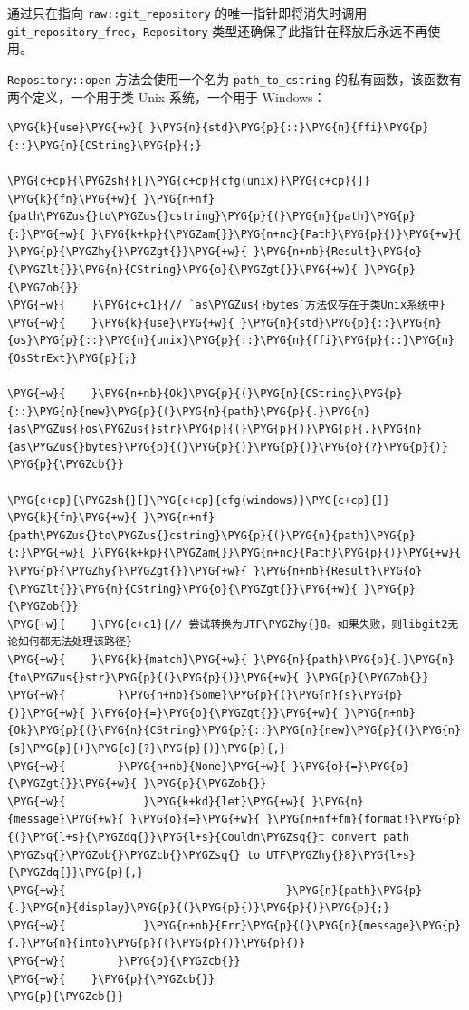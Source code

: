 通过只在指向 \texttt{raw::git\_repository} 的唯一指针即将消失时调用 \texttt{git\_repository\_free}，\texttt{Repository} 类型还确保了此指针在释放后永远不再使用。

\texttt{Repository::open} 方法会使用一个名为 \texttt{path\_to\_cstring} 的私有函数，该函数有两个定义，一个用于类 Unix 系统，一个用于 Windows：

\begin{Verbatim}[commandchars=\\\{\},breaklines=true,breakanywhere=true,fontsize=\codefont,xleftmargin=17bp]
\PYG{k}{use}\PYG{+w}{ }\PYG{n}{std}\PYG{p}{::}\PYG{n}{ffi}\PYG{p}{::}\PYG{n}{CString}\PYG{p}{;}

\PYG{c+cp}{\PYGZsh{}[}\PYG{c+cp}{cfg(unix)}\PYG{c+cp}{]}
\PYG{k}{fn}\PYG{+w}{ }\PYG{n+nf}{path\PYGZus{}to\PYGZus{}cstring}\PYG{p}{(}\PYG{n}{path}\PYG{p}{:}\PYG{+w}{ }\PYG{k+kp}{\PYGZam{}}\PYG{n+nc}{Path}\PYG{p}{)}\PYG{+w}{ }\PYG{p}{\PYGZhy{}\PYGZgt{}}\PYG{+w}{ }\PYG{n+nb}{Result}\PYG{o}{\PYGZlt{}}\PYG{n}{CString}\PYG{o}{\PYGZgt{}}\PYG{+w}{ }\PYG{p}{\PYGZob{}}
\PYG{+w}{    }\PYG{c+c1}{// `as\PYGZus{}bytes`方法仅存在于类Unix系统中}
\PYG{+w}{    }\PYG{k}{use}\PYG{+w}{ }\PYG{n}{std}\PYG{p}{::}\PYG{n}{os}\PYG{p}{::}\PYG{n}{unix}\PYG{p}{::}\PYG{n}{ffi}\PYG{p}{::}\PYG{n}{OsStrExt}\PYG{p}{;}

\PYG{+w}{    }\PYG{n+nb}{Ok}\PYG{p}{(}\PYG{n}{CString}\PYG{p}{::}\PYG{n}{new}\PYG{p}{(}\PYG{n}{path}\PYG{p}{.}\PYG{n}{as\PYGZus{}os\PYGZus{}str}\PYG{p}{(}\PYG{p}{)}\PYG{p}{.}\PYG{n}{as\PYGZus{}bytes}\PYG{p}{(}\PYG{p}{)}\PYG{p}{)}\PYG{o}{?}\PYG{p}{)}
\PYG{p}{\PYGZcb{}}

\PYG{c+cp}{\PYGZsh{}[}\PYG{c+cp}{cfg(windows)}\PYG{c+cp}{]}
\PYG{k}{fn}\PYG{+w}{ }\PYG{n+nf}{path\PYGZus{}to\PYGZus{}cstring}\PYG{p}{(}\PYG{n}{path}\PYG{p}{:}\PYG{+w}{ }\PYG{k+kp}{\PYGZam{}}\PYG{n+nc}{Path}\PYG{p}{)}\PYG{+w}{ }\PYG{p}{\PYGZhy{}\PYGZgt{}}\PYG{+w}{ }\PYG{n+nb}{Result}\PYG{o}{\PYGZlt{}}\PYG{n}{CString}\PYG{o}{\PYGZgt{}}\PYG{+w}{ }\PYG{p}{\PYGZob{}}
\PYG{+w}{    }\PYG{c+c1}{// 尝试转换为UTF\PYGZhy{}8。如果失败，则libgit2无论如何都无法处理该路径}
\PYG{+w}{    }\PYG{k}{match}\PYG{+w}{ }\PYG{n}{path}\PYG{p}{.}\PYG{n}{to\PYGZus{}str}\PYG{p}{(}\PYG{p}{)}\PYG{+w}{ }\PYG{p}{\PYGZob{}}
\PYG{+w}{        }\PYG{n+nb}{Some}\PYG{p}{(}\PYG{n}{s}\PYG{p}{)}\PYG{+w}{ }\PYG{o}{=}\PYG{o}{\PYGZgt{}}\PYG{+w}{ }\PYG{n+nb}{Ok}\PYG{p}{(}\PYG{n}{CString}\PYG{p}{::}\PYG{n}{new}\PYG{p}{(}\PYG{n}{s}\PYG{p}{)}\PYG{o}{?}\PYG{p}{)}\PYG{p}{,}
\PYG{+w}{        }\PYG{n+nb}{None}\PYG{+w}{ }\PYG{o}{=}\PYG{o}{\PYGZgt{}}\PYG{+w}{ }\PYG{p}{\PYGZob{}}
\PYG{+w}{            }\PYG{k+kd}{let}\PYG{+w}{ }\PYG{n}{message}\PYG{+w}{ }\PYG{o}{=}\PYG{+w}{ }\PYG{n+nf+fm}{format!}\PYG{p}{(}\PYG{l+s}{\PYGZdq{}}\PYG{l+s}{Couldn\PYGZsq{}t convert path \PYGZsq{}\PYGZob{}\PYGZcb{}\PYGZsq{} to UTF\PYGZhy{}8}\PYG{l+s}{\PYGZdq{}}\PYG{p}{,}
\PYG{+w}{                                  }\PYG{n}{path}\PYG{p}{.}\PYG{n}{display}\PYG{p}{(}\PYG{p}{)}\PYG{p}{)}\PYG{p}{;}
\PYG{+w}{            }\PYG{n+nb}{Err}\PYG{p}{(}\PYG{n}{message}\PYG{p}{.}\PYG{n}{into}\PYG{p}{(}\PYG{p}{)}\PYG{p}{)}
\PYG{+w}{        }\PYG{p}{\PYGZcb{}}
\PYG{+w}{    }\PYG{p}{\PYGZcb{}}
\PYG{p}{\PYGZcb{}}
\end{Verbatim}

